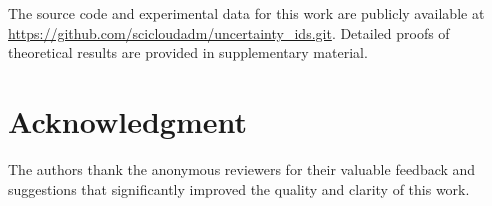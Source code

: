 \documentclass[journal]{IEEEtran}
\begin{document}
The source code and experimental data for this work are publicly available at \url{https://github.com/scicloudadm/uncertainty_ids.git}. Detailed proofs of theoretical results are provided in supplementary material.

\section*{Acknowledgment}

The authors thank the anonymous reviewers for their valuable feedback and suggestions that significantly improved the quality and clarity of this work.



\end{document}
